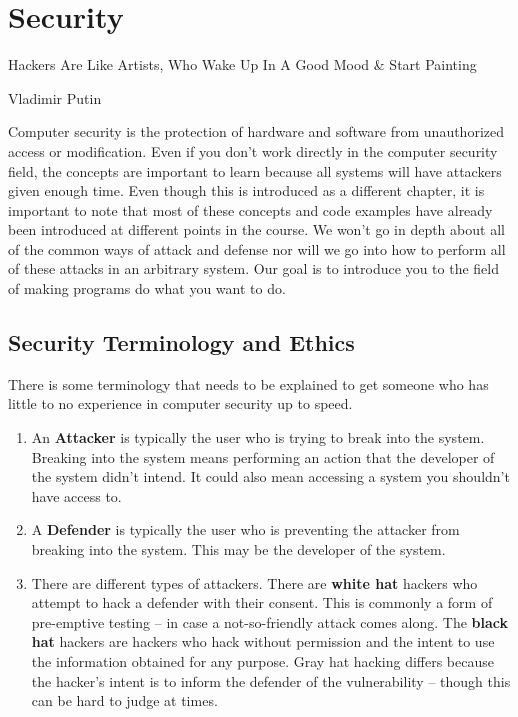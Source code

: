 \chapter{Security}

\epigraph{Hackers Are Like Artists, Who Wake Up In A Good Mood \& Start Painting}{Vladimir Putin}

Computer security is the protection of hardware and software from unauthorized access or modification.
Even if you don't work directly in the computer security field, the concepts are important to learn because all systems will have attackers given enough time.
Even though this is introduced as a different chapter, it is important to note that most of these concepts and code examples have already been introduced at different points in the course.
We won't go in depth about all of the common ways of attack and defense nor will we go into how to perform all of these attacks in an arbitrary system.
Our goal is to introduce you to the field of making programs do what you want to do.

\section{Security Terminology and Ethics}

There is some terminology that needs to be explained to get someone who has little to no experience in computer security up to speed.

\begin{enumerate}
\item An \textbf{Attacker} is typically the user who is trying to break into the system. Breaking into the system means performing an action that the developer of the system didn't intend. It could also mean accessing a system you shouldn't have access to.
\item A \textbf{Defender} is typically the user who is preventing the attacker from breaking into the system. This may be the developer of the system.
\item There are different types of attackers. There are \textbf{white hat} hackers who attempt to hack a defender with their consent. This is commonly a form of pre-emptive testing -- in case a not-so-friendly attack comes along. The \textbf{black hat} hackers are hackers who hack without permission and the intent to use the information obtained for any purpose. Gray hat hacking differs because the hacker's intent is to inform the defender of the vulnerability -- though this can be hard to judge at times.
\end{enumerate}

